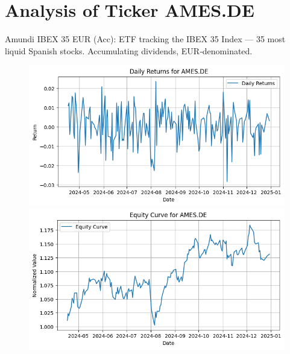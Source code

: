 \documentclass{article}%
\begin{document}
%
\newpage

%
\section*{Analysis of Ticker AMES.DE}%
\label{sec:AnalysisofTickerAMES.DE}%
Amundi IBEX 35 EUR (Acc): ETF tracking the IBEX 35 Index — 35 most liquid Spanish stocks. Accumulating dividends, EUR‑denominated.%


\begin{figure}[htbp]%
\begin{minipage}{0.49\textwidth}%
\includegraphics[width=\linewidth]{ticker_images/AMES.DE_daily_returns.png}%
\end{minipage}%
\begin{minipage}{0.49\textwidth}%
\includegraphics[width=\linewidth]{ticker_images/AMES.DE_equity_curve.png}%
\end{minipage}%
\end{figure}

%
\end{document}
